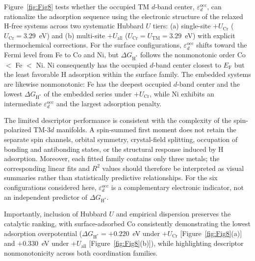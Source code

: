 \documentclass[journal=jacsat,manuscript=article]{achemso}
\begin{document}
{\color{revcolor}%
  Figure~\ref{fig:Fig8} tests whether the occupied TM $d$-band center, $\varepsilon_d^{\mathrm{occ}}$, can rationalize the adsorption sequence using the electronic structure of the relaxed H-free systems across two systematic Hubbard $U$ tiers: (a) single-site $+U_{\mathrm{Cr}}$ ($U_{\mathrm{Cr}} = 3.29$~eV) and (b) multi-site $+U_{\mathrm{all}}$ ($U_{\mathrm{Cr}} = U_{\mathrm{TM}} = 3.29$~eV) with explicit thermochemical corrections. For the surface configurations, $\varepsilon_d^{\mathrm{occ}}$ shifts toward the Fermi level from Fe to Co and Ni, but $\Delta G_{\mathrm{H}^*}$ follows the nonmonotonic order Co $<$ Fe $<$ Ni. Ni consequently has the occupied $d$-band center closest to $E_{\mathrm F}$ but the least favorable H adsorption within the surface family. The embedded systems are likewise nonmonotonic: Fe has the deepest occupied $d$-band center and the lowest $\Delta G_{\mathrm{H}^*}$ of the embedded series under $+U_{\mathrm{Cr}}$, while Ni exhibits an intermediate $\varepsilon_d^{\mathrm{occ}}$ and the largest adsorption penalty.

  The limited descriptor performance is consistent with the complexity of the spin-polarized TM-$3d$ manifolds. A spin-summed first moment does not retain the separate spin channels, orbital symmetry, crystal-field splitting, occupation of bonding and antibonding states, or the structural response induced by H adsorption. Moreover, each fitted family contains only three metals; the corresponding linear fits and $R^2$ values should therefore be interpreted as visual summaries rather than statistically predictive relationships. For the six configurations considered here, $\varepsilon_d^{\mathrm{occ}}$ is a complementary electronic indicator, not an independent predictor of $\Delta G_{\mathrm{H}^*}$.

  Importantly, inclusion of Hubbard $U$ and empirical dispersion preserves the catalytic ranking, with surface-adsorbed Co consistently demonstrating the lowest adsorption overpotential ($\Delta G_{\mathrm{H}^*} = +0.220$~eV under $+U_{\mathrm{Cr}}$ [Figure~\ref{fig:Fig8}(a)] and $+0.330$~eV under $+U_{\mathrm{all}}$ [Figure~\ref{fig:Fig8}(b)]), while highlighting descriptor nonmonotonicity across both coordination families.
\par}
\end{document}
